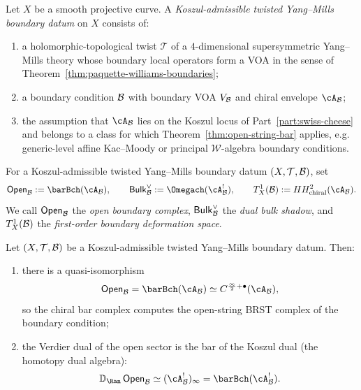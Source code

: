 \begin{definition}
Let $X$ be a smooth projective curve. A \emph{Koszul-admissible twisted Yang--Mills boundary datum}
on $X$ consists of:
\begin{enumerate}[label=(\roman*)]
\item a holomorphic-topological twist $\mathcal{T}$ of a $4$-dimensional supersymmetric
Yang--Mills theory whose boundary local operators form a VOA in the sense of
Theorem~\ref{thm:paquette-williams-boundaries};
\item a boundary condition $\mathcal{B}$ with boundary VOA $V_{\mathcal{B}}$ and chiral envelope $\cA_{\cB}$;
\item the assumption that $\cA_{\cB}$ lies on the Koszul locus of Part~\ref{part:swiss-cheese} and belongs to a class
for which Theorem~\ref{thm:open-string-bar} applies, e.g. generic-level affine
Kac--Moody or principal $\mathcal{W}$-algebra boundary conditions.
\end{enumerate}
\end{definition}

\begin{notation}
For a Koszul-admissible twisted Yang--Mills boundary datum $(X,\mathcal{T},\mathcal{B})$, set
\[
\mathsf{Open}_{\cB} := \barBch(\cA_{\cB}),
\qquad
\mathsf{Bulk}^{\vee}_{\cB} := \Omegach(\cA_{\cB}^!),
\qquad
T^1_X(\cB) := HH^2_{\mathrm{chiral}}(\cA_{\cB}).
\]
We call $\mathsf{Open}_{\mathcal{B}}$ the \emph{open boundary complex}, $\mathsf{Bulk}^{\vee}_{\mathcal{B}}$ the
\emph{dual bulk shadow}, and $T^1_X(\mathcal{B})$ the \emph{first-order boundary deformation space}.
\end{notation}

\begin{theorem}
Let $(X,\mathcal{T},\mathcal{B})$ be a Koszul-admissible twisted Yang--Mills boundary datum.
Then:
\begin{enumerate}[label=(\alph*)]
\item there is a quasi-isomorphism
\[
\mathsf{Open}_{\cB} = \barBch(\cA_{\cB}) \simeq C^{\frac{\infty}{2}+\bullet}(\cA_{\cB}),
\]
so the chiral bar complex computes the open-string BRST complex of the boundary condition;
\item the Verdier dual of the open sector is the bar of the Koszul dual (the homotopy dual algebra):
\[
\mathbb{D}_{\Ran}\, \mathsf{Open}_{\cB} \simeq (\cA_{\cB}^!)_{\infty} = \barBch(\cA_{\cB}^!).
\]
\end{enumerate}
\end{theorem}

